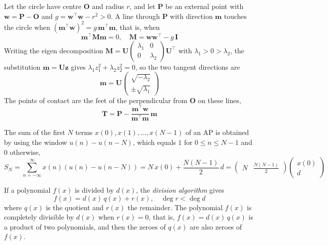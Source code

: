 \item Let the circle have centre $\mathbf{O}$ and radius $r$, and let $\mathbf{P}$ be an external point with $\mathbf{w} = \mathbf{P} - \mathbf{O}$ and $g = \mathbf{w}^{\top}\mathbf{w} - r^2 > 0$. A line through $\mathbf{P}$ with direction $\mathbf{m}$ touches the circle when $\left(\mathbf{m}^{\top}\mathbf{w}\right)^2 = g\,\mathbf{m}^{\top}\mathbf{m}$, that is, when
\begin{equation}
\mathbf{m}^{\top}\mathbf{M}\mathbf{m} = 0, \quad \mathbf{M} = \mathbf{w}\mathbf{w}^{\top} - g\,\mathbf{I}
\label{c10eq:tangm}
\end{equation}
Writing the eigen decomposition $\mathbf{M} = \mathbf{U}\begin{pmatrix} \lambda_1 & 0 \\ 0 & \lambda_2 \end{pmatrix}\mathbf{U}^{\top}$ with $\lambda_1 > 0 > \lambda_2$, the substitution $\mathbf{m} = \mathbf{U}\mathbf{z}$ gives $\lambda_1z_1^2 + \lambda_2z_2^2 = 0$, so the two tangent directions are
\begin{equation}
\mathbf{m} = \mathbf{U}\begin{pmatrix} \sqrt{-\lambda_2} \\ \pm\sqrt{\lambda_1} \end{pmatrix}
\label{c10eq:tangdir}
\end{equation}
The points of contact are the feet of the perpendicular from $\mathbf{O}$ on these lines,
\begin{equation}
\mathbf{T} = \mathbf{P} - \frac{\mathbf{m}^{\top}\mathbf{w}}{\mathbf{m}^{\top}\mathbf{m}}\,\mathbf{m}
\label{c10eq:tangpt}
\end{equation}

\item The sum of the first $N$ terms $x(0), x(1), \dots, x(N-1)$ of an AP is obtained by using the window $u(n) - u(n - N)$, which equals $1$ for $0 \le n \le N-1$ and $0$ otherwise,
\begin{equation}
S_N = \sum_{n=-\infty}^{\infty} x(n)\left(u(n) - u(n - N)\right) = N\,x(0) + \frac{N(N-1)}{2}\,d = \begin{pmatrix} N & \frac{N(N-1)}{2} \end{pmatrix}\begin{pmatrix} x(0) \\ d \end{pmatrix}
\label{c10eq:apsum}
\end{equation}

\item If a polynomial $f(x)$ is divided by $d(x)$, the \emph{division algorithm} gives
\begin{equation}
f(x) = d(x)\,q(x) + r(x), \quad \deg r < \deg d
\label{c10eq:divalg}
\end{equation}
where $q(x)$ is the quotient and $r(x)$ the remainder. The polynomial $f(x)$ is completely divisible by $d(x)$ when $r(x) = 0$, that is, $f(x) = d(x)\,q(x)$ is a product of two polynomials, and then the zeroes of $q(x)$ are also zeroes of $f(x)$.

